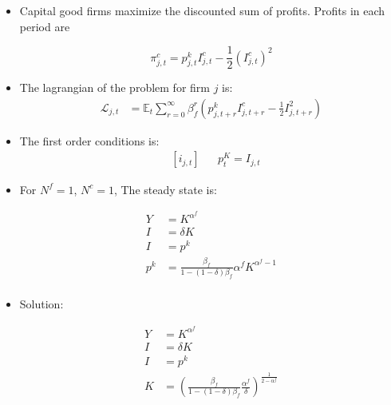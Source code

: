 \documentclass[11pt]{article}
\newcommand{\E}{\mathbb{E}}
\numberwithin{equation}{section}
\begin{document}
\begin{itemize}
	
	\item Capital good firms maximize the discounted sum of profits. Profits in each period are
	
	$$\pi^c_{j,t}=p^k_{j,t} I^c_{j,t}-\frac{1}{2} \left(I^c_{j,t}\right)^2  $$
	
	
	\item The lagrangian of the problem for firm $j$ is:
	\begin{align*}
	\mathcal{L}_{j,t} &= \E_t \sum_{r=0}^{\infty}\beta^r_f \left(
	p^k_{j,t+r} I^c_{j,t+r}-\frac{1}{2} I^2_{j,t+r} \right)
	\end{align*}
	
	\item The first order conditions is:
	\begin{align}
	& \left[i_{j,t}\right]&& p^K_{t} = I_{j,t}
	\end{align}


	\item  For $N^f=1$, $N^c=1$, The steady state is:
	
	\begin{align*}
	Y & =  	K^{\alpha^f}  \\
	I & = \delta K\\
	I & = p^k \\  
	p^k & =\frac{\beta_f}{1-(1-\delta)\beta_f}  \alpha^f K^{\alpha^f-1}  \\ 
	\end{align*}
	
	\item Solution:
	
	\begin{align*}
	Y & =  	K^{\alpha^f}  \\
	I & = \delta K\\
	I & = p^k \\  
 	 K & =\left(\frac{ \beta_f}{1-(1-\delta)\beta_f}  \frac{\alpha^f}{\delta} \right)^{\frac{1}{2-\alpha^f}}  
	\end{align*}
	
\end{itemize}
	
\end{document}
